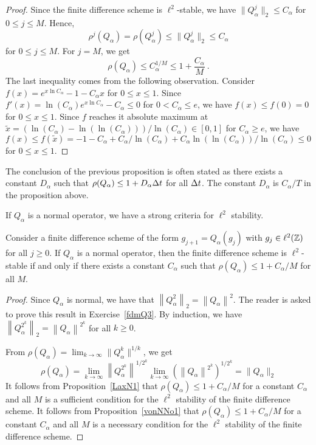 \begin{proof}
Since the finite difference scheme is $\ell^2$-stable, we have
$\|Q_\alpha^j\|_2 \leq C_\alpha$ for $0\leq j \leq M$.
Hence,
\[
  \rho^j(Q_\alpha) = \rho(Q_\alpha^j) \leq \|Q_\alpha^j\|_2 \leq C_\alpha
\]
for $0\leq j \leq M$.  For $j=M$, we get
\[
  \rho(Q_\alpha) \leq C_\alpha^{1/M} \leq 1 + \frac{C_\alpha}{M} \ .
\]
The last inequality comes from the following observation.
Consider $\displaystyle f(x) = e^{x\ln{C_\alpha}} - 1 - C_\alpha x$ for
$0 \leq x \leq 1$.  Since
$\displaystyle f'(x) = \ln(C_\alpha) e^{x\ln{C_\alpha}} - C_\alpha \leq 0$ for
$0 < C_\alpha \leq e$, we have $f(x) \leq f(0) = 0$ for $0\leq x \leq 1$.
Since $f$ reaches it absolute maximum at
$\tilde{x} = (\ln(C_\alpha) - \ln(\ln(C_\alpha)))/\ln(C_\alpha) \in [0,1]$
for $C_\alpha \geq e$, we have
$f(x) \leq f(\tilde{x}) = -1 -C_\alpha + C_\alpha/\ln(C_\alpha) + C_\alpha
\ln(\ln(C_\alpha))/\ln(C_\alpha) \leq 0$ for $0\leq x \leq 1$.
\end{proof}

\begin{rmk}
The conclusion of the previous proposition is often stated as
there exists a constant $D_\alpha$ such that
$\rho(Q_\alpha) \leq 1 + D_\alpha \Delta{t}$ for all $\Delta{t}$.
The constant $D_\alpha$ is $C_\alpha/T$ in the proposition above. 
\end{rmk}

If $Q_\alpha$ is a normal operator, we have a strong criteria for
$\ell^2$ stability.

\begin{prop}[Lax]
Consider a finite difference scheme of the form $g_{j+1} = Q_\alpha(g_j)$
with $g_j \in \ell^2(\mathbb{Z})$ for all $j \geq 0$.  If $Q_\alpha$ is a
normal operator, then the finite difference scheme is
$\ell^2$-stable if and only if there exists a constant $C_\alpha$ such
that $\rho(Q_\alpha) \leq 1 + C_\alpha/M$ for all $M$.
\end{prop}

\begin{proof}
Since $Q_\alpha$ is normal, we have that
$\displaystyle \left\|Q_\alpha^2 \right\|_2 = \left\|Q_\alpha\right\|^2$.
The reader is asked to prove this result in Exercise~\ref{fdmQ3}.  By
induction, we have
$\displaystyle \left\|Q_\alpha^{2^k} \right\|_2 = \left\|Q_\alpha\right\|^{2^k}$
for all $k\geq 0$.

From $\displaystyle \rho\left(Q_\alpha\right)
= \lim_{k\to \infty} \|Q_\alpha^k\|^{1/k}$, we get
\[
\rho\left(Q_\alpha\right)
= \lim_{k\to \infty} \left\|Q_\alpha^{2^k}\right\|^{1/2^k}
\lim_{k\to \infty} \left(\left\|Q_\alpha\right\|^{2^k}\right)^{1/2^k}
= \|Q_\alpha\|_2
\]
It follows from Proposition~\ref{LaxN1} that
$\rho\left(Q_\alpha\right) \leq 1 + C_\alpha/M$ for a constant $C_\alpha$
and all $M$ is a sufficient condition for the $\ell^2$ stability of
the finite difference scheme.  It follows from
Proposition~\ref{vonNNo1} that
$\rho\left(Q_\alpha\right) \leq 1 + C_\alpha/M$ for a constant $C_\alpha$
and all $M$ is a necessary condition for the $\ell^2$ stability of
the finite difference scheme.
\end{proof}

